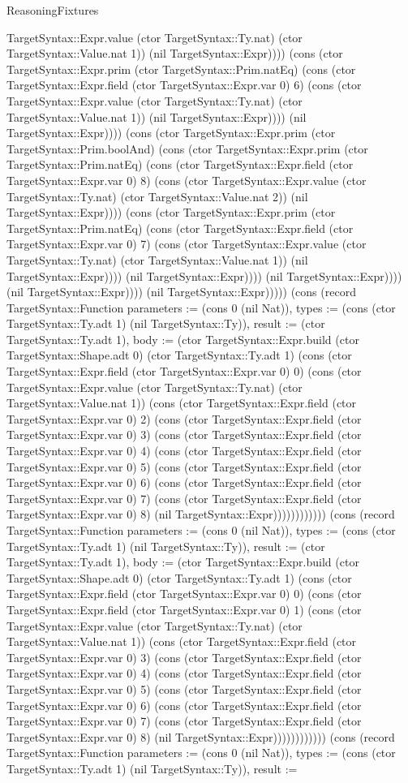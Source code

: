\begin{lexlean}{ReasoningFixtures}
\begin{semanticmodule}
{TargetSyntax::Expr.value (ctor TargetSyntax::Ty.nat) (ctor TargetSyntax::Value.nat 1)) (nil TargetSyntax::Expr)))) (cons (ctor TargetSyntax::Expr.prim (ctor TargetSyntax::Prim.natEq) (cons (ctor TargetSyntax::Expr.field (ctor TargetSyntax::Expr.var 0) 6) (cons (ctor TargetSyntax::Expr.value (ctor TargetSyntax::Ty.nat) (ctor TargetSyntax::Value.nat 1)) (nil TargetSyntax::Expr)))) (nil TargetSyntax::Expr)))) (cons (ctor TargetSyntax::Expr.prim (ctor TargetSyntax::Prim.boolAnd) (cons (ctor TargetSyntax::Expr.prim (ctor TargetSyntax::Prim.natEq) (cons (ctor TargetSyntax::Expr.field (ctor TargetSyntax::Expr.var 0) 8) (cons (ctor TargetSyntax::Expr.value (ctor TargetSyntax::Ty.nat) (ctor TargetSyntax::Value.nat 2)) (nil TargetSyntax::Expr)))) (cons (ctor TargetSyntax::Expr.prim (ctor TargetSyntax::Prim.natEq) (cons (ctor TargetSyntax::Expr.field (ctor TargetSyntax::Expr.var 0) 7) (cons (ctor TargetSyntax::Expr.value (ctor TargetSyntax::Ty.nat) (ctor TargetSyntax::Value.nat 1)) (nil TargetSyntax::Expr)))) (nil TargetSyntax::Expr)))) (nil TargetSyntax::Expr)))) (nil TargetSyntax::Expr)))) (nil TargetSyntax::Expr))))}) (cons (record TargetSyntax::Function {parameters := (cons 0 (nil Nat)), types := (cons (ctor TargetSyntax::Ty.adt 1) (nil TargetSyntax::Ty)), result := (ctor TargetSyntax::Ty.adt 1), body := (ctor TargetSyntax::Expr.build (ctor TargetSyntax::Shape.adt 0) (ctor TargetSyntax::Ty.adt 1) (cons (ctor TargetSyntax::Expr.field (ctor TargetSyntax::Expr.var 0) 0) (cons (ctor TargetSyntax::Expr.value (ctor TargetSyntax::Ty.nat) (ctor TargetSyntax::Value.nat 1)) (cons (ctor TargetSyntax::Expr.field (ctor TargetSyntax::Expr.var 0) 2) (cons (ctor TargetSyntax::Expr.field (ctor TargetSyntax::Expr.var 0) 3) (cons (ctor TargetSyntax::Expr.field (ctor TargetSyntax::Expr.var 0) 4) (cons (ctor TargetSyntax::Expr.field (ctor TargetSyntax::Expr.var 0) 5) (cons (ctor TargetSyntax::Expr.field (ctor TargetSyntax::Expr.var 0) 6) (cons (ctor TargetSyntax::Expr.field (ctor TargetSyntax::Expr.var 0) 7) (cons (ctor TargetSyntax::Expr.field (ctor TargetSyntax::Expr.var 0) 8) (nil TargetSyntax::Expr)))))))))))}) (cons (record TargetSyntax::Function {parameters := (cons 0 (nil Nat)), types := (cons (ctor TargetSyntax::Ty.adt 1) (nil TargetSyntax::Ty)), result := (ctor TargetSyntax::Ty.adt 1), body := (ctor TargetSyntax::Expr.build (ctor TargetSyntax::Shape.adt 0) (ctor TargetSyntax::Ty.adt 1) (cons (ctor TargetSyntax::Expr.field (ctor TargetSyntax::Expr.var 0) 0) (cons (ctor TargetSyntax::Expr.field (ctor TargetSyntax::Expr.var 0) 1) (cons (ctor TargetSyntax::Expr.value (ctor TargetSyntax::Ty.nat) (ctor TargetSyntax::Value.nat 1)) (cons (ctor TargetSyntax::Expr.field (ctor TargetSyntax::Expr.var 0) 3) (cons (ctor TargetSyntax::Expr.field (ctor TargetSyntax::Expr.var 0) 4) (cons (ctor TargetSyntax::Expr.field (ctor TargetSyntax::Expr.var 0) 5) (cons (ctor TargetSyntax::Expr.field (ctor TargetSyntax::Expr.var 0) 6) (cons (ctor TargetSyntax::Expr.field (ctor TargetSyntax::Expr.var 0) 7) (cons (ctor TargetSyntax::Expr.field (ctor TargetSyntax::Expr.var 0) 8) (nil TargetSyntax::Expr)))))))))))}) (cons (record TargetSyntax::Function {parameters := (cons 0 (nil Nat)), types := (cons (ctor TargetSyntax::Ty.adt 1) (nil TargetSyntax::Ty)), result := }
\end{semanticmodule}
\end{lexlean}
